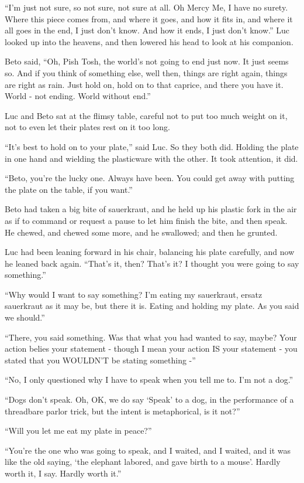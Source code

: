 ``I'm just not sure, so not sure, not sure at all. Oh Mercy Me, I have
no surety. Where this piece comes from, and where it goes, and how it
fits in, and where it all goes in the end, I just don't know. And how it
ends, I just don't know.'' Luc looked up into the heavens, and then
lowered his head to look at his companion.

Beto said, ``Oh, Pish Tosh, the world's not going to end just now. It
just seems so. And if you think of something else, well then, things are
right again, things are right as rain. Just hold on, hold on to that
caprice, and there you have it. World - not ending. World without end.''

Luc and Beto sat at the flimsy table, careful not to put too much weight
on it, not to even let their plates rest on it too long.

``It's best to hold on to your plate,'' said Luc. So they both did.
Holding the plate in one hand and wielding the plasticware with the
other. It took attention, it did.

``Beto, you're the lucky one. Always have been. You could get away with
putting the plate on the table, if you want.''

Beto had taken a big bite of sauerkraut, and he held up his plastic fork
in the air as if to command or request a pause to let him finish the
bite, and then speak. He chewed, and chewed some more, and he swallowed;
and then he grunted.

Luc had been leaning forward in his chair, balancing his plate
carefully, and now he leaned back again. ``That's it, then? That's it? I
thought you were going to say something.''

``Why would I want to say something? I'm eating my sauerkraut, ersatz
sauerkraut as it may be, but there it is. Eating and holding my plate.
As you said we should.''

``There, you said something. Was that what you had wanted to say, maybe?
Your action belies your statement - though I mean your action IS your
statement - you stated that you WOULDN'T be stating something -''

``No, I only questioned why I have to speak when you tell me to. I'm not
a dog.''

``Dogs don't speak. Oh, OK, we do say `Speak' to a dog, in the
performance of a threadbare parlor trick, but the intent is
metaphorical, is it not?''

``Will you let me eat my plate in peace?''

``You're the one who was going to speak, and I waited, and I waited, and
it was like the old saying, `the elephant labored, and gave birth to a
mouse'. Hardly worth it, I say. Hardly worth it.''

